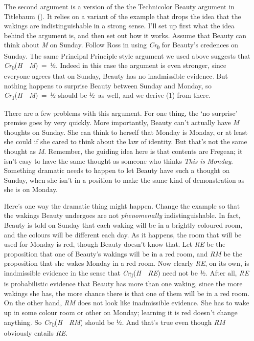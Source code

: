 \documentclass[
  10pt,
  letterpaper,
  DIV=11,
  numbers=noendperiod,
  twoside]{scrartcl}
\begin{document}
The second argument is a version of the the Technicolor Beauty argument
in Titlebaum (). It relies on a
variant of the example that drops the idea that the wakings are
indistinguishable in a strong sense. I'll set up first what the idea
behind the argument is, and then set out how it works. Assume that
Beauty can think about \emph{M} on Sunday. Follow Ross in using
\emph{Cr}\textsubscript{0} for Beauty's credences on Sunday. The same
Principal Principle style argument we used above suggests that
\emph{Cr}\textsubscript{0}(\emph{H}~\textbar~\emph{M})~=~½. Indeed in
this case the argument is even stronger, since everyone agrees that on
Sunday, Beauty has no inadmissible evidence. But nothing happens to
surprise Beauty between Sunday and Monday, so
\emph{Cr}\textsubscript{1}(\emph{H}~\textbar~\emph{M})~=~½ should be
½~as well, and we derive (1) from there.

There are a few problems with this argument. For one thing, the `no
surprise' premise goes by very quickly. More importantly, Beauty can't
actually have \emph{M} thoughts on Sunday. She can think to herself that
Monday is Monday, or at least she could if she cared to think about the
law of identity. But that's not the same thought as \emph{M}. Remember,
the guiding idea here is that contents are Fregean; it isn't easy to
have the same thought as someone who thinks \emph{This is Monday}.
Something dramatic needs to happen to let Beauty have such a thought on
Sunday, when she isn't in a position to make the same kind of
demonstration as she is on Monday.

Here's one way the dramatic thing might happen. Change the example so
that the wakings Beauty undergoes are not \emph{phenomenally}
indistinguishable. In fact, Beauty is told on Sunday that each waking
will be in a brightly coloured room, and the colours will be different
each day. As it happens, the room that will be used for Monday is red,
though Beauty doesn't know that. Let \emph{RE} be the proposition that
one of Beauty's wakings will be in a red room, and \emph{RM} be the
proposition that she wakes Monday in a red room. Now clearly \emph{RE},
on its own, is inadmissible evidence in the sense that
\emph{Cr}\textsubscript{0}(\emph{H}~\textbar~\emph{RE}) need not be ½.
After all, \emph{RE} is probabilistic evidence that Beauty has more than
one waking, since the more wakings she has, the more chance there is
that one of them will be in a red room. On the other hand, \emph{RM}
does not look like inadmissible evidence. She has to wake up in some
colour room or other on Monday; learning it is red doesn't change
anything. So \emph{Cr}\textsubscript{0}(\emph{H}~\textbar~\emph{RM})
should be ½. And that's true even though \emph{RM} obviously entails
\emph{RE}.
\end{document}
